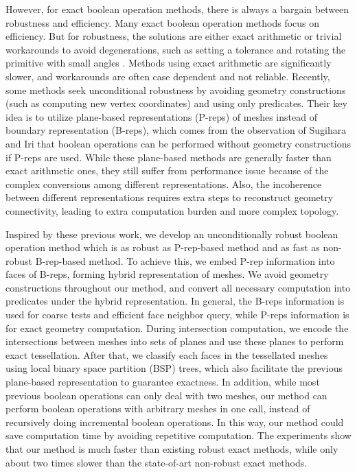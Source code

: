 \documentclass[10pt,journal,compsoc]{IEEEtran}
\begin{document}
However, for exact boolean operation methods, there is always a bargain between robustness and efficiency. Many exact boolean operation methods focus on efficiency. But for robustness, the solutions are either exact arithmetic \cite{barki2015exact,zhou2016mesh} or trivial workarounds to avoid degenerations, such as setting a tolerance \cite{feito2013fast,segal1990using} and rotating the primitive with small angles \cite{douze2015quickcsg}. Methods using exact arithmetic are significantly slower, and workarounds are often case dependent and not reliable. Recently, some methods \cite{bernstein2009fast,campen2010exact} seek unconditional robustness by avoiding geometry constructions (such as computing new vertex coordinates) and using only predicates. Their key idea is to utilize plane-based representations (P-reps) of meshes instead of boundary representation (B-reps), which comes from the observation of Sugihara and Iri \cite{sugihara1990solid} that boolean operations can be performed without geometry constructions if P-reps are used. While these plane-based methods are generally faster than exact arithmetic ones, they still suffer from performance issue because of the complex conversions among different representations. Also, the incoherence between different representations requires extra steps to reconstruct geometry connectivity, leading to extra computation burden and more complex topology.

Inspired by these previous work, we develop an unconditionally robust boolean operation method which is as robust as P-rep-based method and as fast as non-robust B-rep-based method. To achieve this, we embed P-rep information into faces of B-reps, forming hybrid representation of meshes. We avoid geometry constructions throughout our method, and convert all necessary computation into predicates under the hybrid representation. In general, the B-reps information is used for coarse tests and efficient face neighbor query, while P-reps information is for exact geometry computation. During intersection computation, we encode the intersections between meshes into sets of planes and use these planes to perform exact tessellation. After that, we classify each faces in the tessellated meshes using local binary space partition (BSP) trees, which also facilitate the previous plane-based representation to guarantee exactness.  In addition, while most previous boolean operations can only deal with two meshes, our method can perform boolean operations with arbitrary meshes in one call, instead of recursively doing incremental boolean operations. In this way, our method could save computation time by avoiding repetitive computation. The experiments show that our method is much faster than existing robust exact methods, while only about two times slower than the state-of-art non-robust exact methods.
\end{document}
